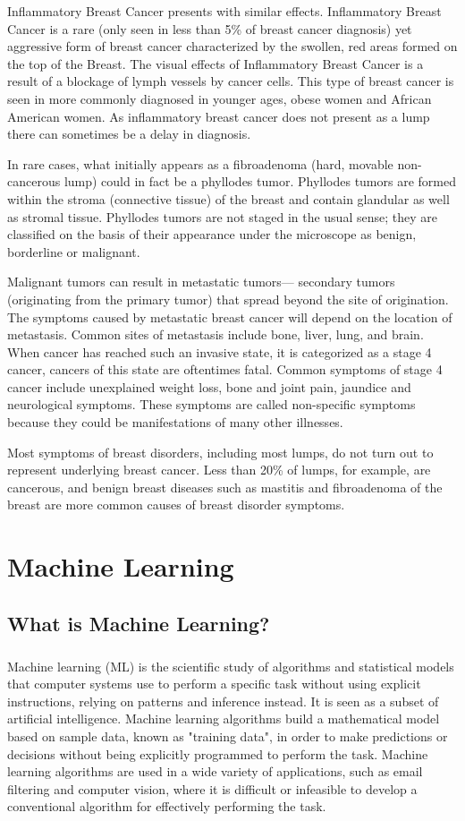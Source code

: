 \documentclass{report}
\begin{document}
Inflammatory Breast Cancer presents with similar effects. Inflammatory Breast Cancer is a rare (only seen in less than 5\% of breast cancer diagnosis) yet aggressive form of breast cancer characterized by the swollen, red areas formed on the top of the Breast. The visual effects of Inflammatory Breast Cancer is a result of a blockage of lymph vessels by cancer cells. This type of breast cancer is seen in more commonly diagnosed in younger ages, obese women and African American women. As inflammatory breast cancer does not present as a lump there can sometimes be a delay in diagnosis.

In rare cases, what initially appears as a fibroadenoma (hard, movable non-cancerous lump) could in fact be a phyllodes tumor. Phyllodes tumors are formed within the stroma (connective tissue) of the breast and contain glandular as well as stromal tissue. Phyllodes tumors are not staged in the usual sense; they are classified on the basis of their appearance under the microscope as benign, borderline or malignant.

Malignant tumors can result in metastatic tumors— secondary tumors (originating from the primary tumor) that spread beyond the site of origination. The symptoms caused by metastatic breast cancer will depend on the location of metastasis. Common sites of metastasis include bone, liver, lung, and brain. When cancer has reached such an invasive state, it is categorized as a stage 4 cancer, cancers of this state are oftentimes fatal. Common symptoms of stage 4 cancer include unexplained weight loss, bone and joint pain, jaundice and neurological symptoms. These symptoms are called non-specific symptoms because they could be manifestations of many other illnesses.

Most symptoms of breast disorders, including most lumps, do not turn out to represent underlying breast cancer. Less than 20\% of lumps, for example, are cancerous, and benign breast diseases such as mastitis and fibroadenoma of the breast are more common causes of breast disorder symptoms.


\chapter{Machine Learning}
\section{What is Machine Learning?}
\paragraph{}Machine learning (ML) is the  scientific study of algorithms and statistical models that computer systems use to perform a specific task without using explicit instructions, relying on patterns and inference instead. It is seen as a subset of artificial intelligence. Machine learning algorithms build a mathematical model based on sample data, known as "training data", in order to make predictions or decisions without being explicitly programmed to perform the task. Machine learning algorithms are used in a wide variety of applications, such as email filtering and computer vision, where it is difficult or infeasible to develop a conventional algorithm for effectively performing the task.
\end{document}

